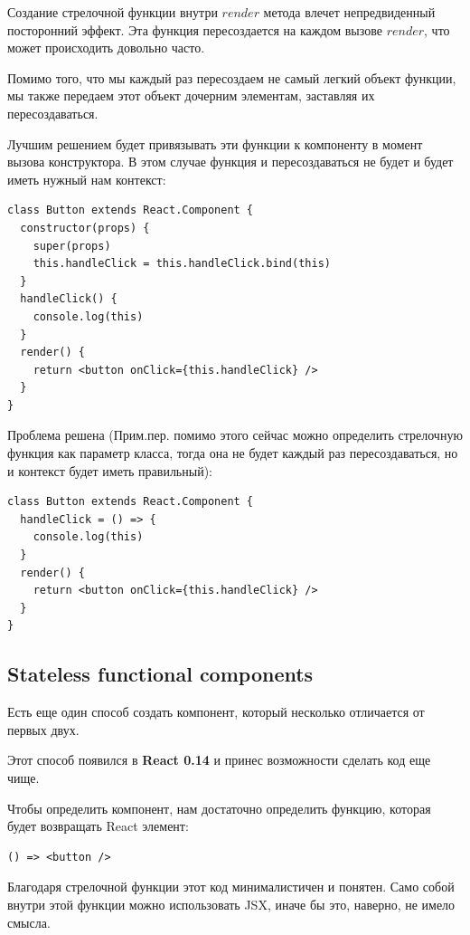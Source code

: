 Создание стрелочной функции внутри $render$ метода влечет непредвиденный посторонний эффект. Эта функция пересоздается на каждом вызове $render$, что может происходить довольно часто. 

Помимо того, что мы каждый раз пересоздаем не самый легкий объект функции, мы также передаем этот объект дочерним элементам, заставляя их пересоздаваться.

Лучшим решением будет привязывать эти функции к компоненту в момент вызова конструктора. В этом случае функция и пересоздаваться не будет и будет иметь нужный нам контекст:

\begin{lstlisting}
class Button extends React.Component {
  constructor(props) {
    super(props)
    this.handleClick = this.handleClick.bind(this)
  }
  handleClick() {
    console.log(this)
  }
  render() {
    return <button onClick={this.handleClick} />
  } 
}
\end{lstlisting}

Проблема решена (Прим.пер. помимо этого сейчас можно определить стрелочную функция как параметр класса, тогда она не будет каждый раз пересоздаваться, но и контекст будет иметь правильный):

\begin{lstlisting}
class Button extends React.Component {
  handleClick = () => {
    console.log(this)
  }
  render() {
    return <button onClick={this.handleClick} />
  } 
}
\end{lstlisting}

\subsection*{Stateless functional components}

Есть еще один способ создать компонент, который несколько отличается от первых двух.

Этот способ появился в \textbf{React 0.14} и принес возможности сделать код еще чище.

Чтобы определить компонент, нам достаточно определить функцию, которая будет возвращать React элемент:

\begin{lstlisting}
() => <button />
\end{lstlisting}

Благодаря стрелочной функции этот код минималистичен и понятен. Само собой внутри этой функции можно использовать JSX, иначе бы это, наверно, не имело смысла.

